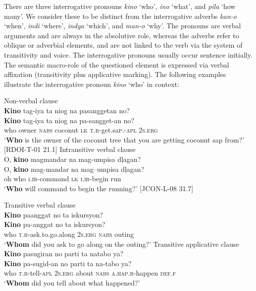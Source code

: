 There are three interrogative pronouns \textit{kino} ‘who’, \textit{ino} ‘what’, and \textit{pila} ‘how many’. We consider these to be distinct from the interrogative adverbs \textit{kan-o} ‘when’, \textit{indi} ‘where’, \textit{indya} ‘which’, and \textit{man-o} ‘why’. The pronouns are verbal arguments and are always in the absolutive role, whereas the adverbs refer to oblique or adverbial elements, and are not linked to the verb via the system of transitivity and voice. The interrogative pronouns usually occur sentence initially. The semantic macro-role of the questioned element is expressed via verbal affixation (transitivity plus applicative marking). The following examples illustrate the interrogative pronoun \textit{kino} ‘who’ in context:

\ea
Non-verbal clause \\
\textbf{Kino}  tag-iya  ta  niog  na  pasanggetan  no? \\\smallskip
 \gll \textbf{Kino}  tag-iya  ta  niog  na  pa-sangget-an  no? \\
who  owner  \textsc{nabs}  coconut  \textsc{lk}  \textsc{t.r}-get.sa\textsc{p.-apl}  2\textsc{s.erg} \\
\glt ‘\textbf{Who} is the owner of the coconut tree that you are getting coconut sap from?’ [RDOI-T-01 21.1]
\z
\ea
Intransitive verbal clause \\ 
O,  \textbf{kino}  magmandar  na  mag-umpisa  dļagan? \\\smallskip
 \gll O,  \textbf{kino}  mag-mandar  na  mag--umpisa  dļagan? \\
oh  who  \textsc{i.ir}-command  \textsc{lk}  \textsc{i.ir}-begin  run \\
\glt `\textbf{Who} will command to begin the running?’ [JCON-L-08 31.7]
\z

\ea
Transitive verbal clause \\
\textbf{Kino}  paanggat  no  ta  iskursyon? \\\smallskip
 \gll \textbf{Kino}  pa-anggat  no  ta  iskursyon? \\
who  \textsc{t.r}-ask.to.go.along  2\textsc{s.erg}  \textsc{nabs}  outing \\
\glt ‘\textbf{Whom} did you ask to go along on the outing?’
\z
\ea
Transitive applicative clause \\
\textbf{Kino}  pasugiran  no  parti   ta  natabo  ya? \\\smallskip
 \gll \textbf{Kino}  pa-sugid-an  no  parti   ta  na-tabo  ya? \\
who  \textsc{t.r}-tell-\textsc{apl}  2\textsc{s.erg}  about  \textsc{nabs}  \textsc{a.hap.r}-happen  \textsc{def.f} \\
\glt `\textbf{Whom} did you tell about what happened?’
\z

